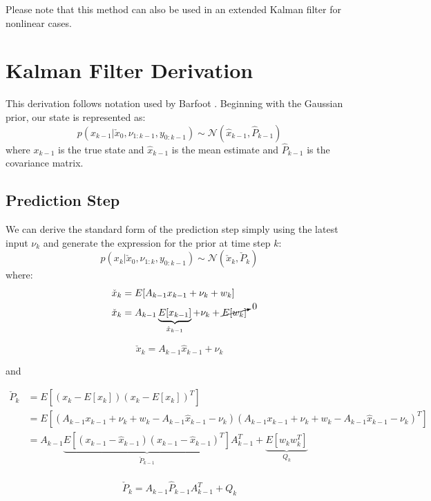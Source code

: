 \documentclass[a4paper]{article}
\begin{document}
Please note that this method can also be used in an extended Kalman filter for nonlinear cases.
	\section{Kalman Filter Derivation}
	This derivation follows notation used by Barfoot \cite{barfoot2017state}. Beginning with the Gaussian prior, our state is represented as:
	\begin{equation}
		p(x_{k-1} | \check{x}_{0}, \nu_{1:k-1}, y_{0:k-1}) \sim \mathcal{N}(\hat{x}_{k-1}, \hat{P}_{k-1})
	\end{equation}
	where $x_{k-1}$ is the true state and $\hat{x}_{k-1}$ is the mean estimate and $\hat{P}_{k-1}$ is the covariance matrix.

	\subsection{Prediction Step}
	We can derive the standard form of the prediction step simply using the latest input $\nu_k$ and generate the expression for the prior at time step $k$:
	\begin{equation}
	p(x_k | \check{x}_{0}, \nu_{1:k}, y_{0:k-1}) \sim \mathcal{N}(\check{x}_{k}, \check{P}_{k})
	\end{equation}
	where:
	\begin{align*}
		\check{x}_k &= E[A_{k-1}x_{k-1} + \nu_k + w_k] \\
		\check{x}_k &= A_{k-1} \underbrace{E[x_{k-1}]}_{\hat{x}_{k-1}} + \nu_k + \cancelto{0}{E[w_k]}
	\end{align*}

	\begin{equation}
		\check{x}_k = A_{k-1} \hat{x}_{k-1} + \nu_k
		\label{eq:process_model}
	\end{equation}

	and

	\begin{align*}
		\check{P}_k &= E[(x_{k} - E[x_k])(x_{k} - E[x_k])^T] \\
		 &= E[(A_{k-1}x_{k-1} + \nu_k + w_k - A_{k-1}\hat{x}_{k-1} - \nu_k)(A_{k-1}x_{k-1} + \nu_k + w_k - A_{k-1}\hat{x}_{k-1} - \nu_k)^T] \\
		 &= A_{k-1} \underbrace{E[(x_{k-1} - \hat{x}_{k-1})(x_{k-1} - \hat{x}_{k-1})^T]}_{\check{P}_{k-1}} A_{k-1}^T + \underbrace{E[w_kw_k^T]}_{Q_k} \\
	\end{align*}

	\begin{equation}
		\check{P}_k = A_{k-1} \hat{P}_{k-1} A_{k-1}^T + Q_k
		\label{eq:process_covariance}
	\end{equation}
\end{document}
